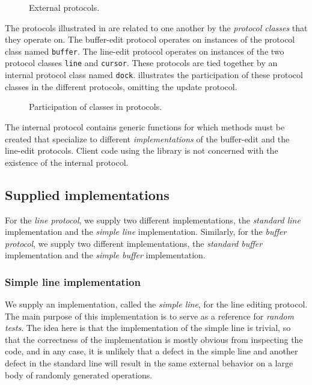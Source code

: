 \begin{figure}
\begin{center}
\end{center}
\caption{\label{fig-external-protocols}
External protocols.}
\end{figure}

The protocols illustrated in  are
related to one another by the \emph{protocol classes} that they
operate on.  The buffer-edit protocol operates on instances of the
protocol class named \texttt{buffer}.  The line-edit protocol operates
on instances of the two protocol classes \texttt{line} and
\texttt{cursor}.  These protocols are tied together by an internal
protocol class named \texttt{dock}.  
illustrates the participation of these protocol classes in the
different protocols, omitting the update protocol.

\begin{figure}
\begin{center}
\end{center}
\caption{\label{fig-participation}
Participation of classes in protocols.}
\end{figure}

The internal protocol contains generic functions for which methods
must be created that specialize to different \emph{implementations} of
the buffer-edit and the line-edit protocols.  Client code using the
library is not concerned with the existence of the internal protocol.

\subsection{Supplied implementations}

For the \emph{line protocol}, we supply two different implementations,
the \emph{standard line} implementation and the \emph{simple line}
implementation.  Similarly, for the \emph{buffer protocol}, we supply
two different implementations, the \emph{standard buffer} implementation
and the \emph{simple buffer} implementation.

\subsubsection{Simple line implementation}

We supply an implementation, called the \emph{simple line}, for
the line editing protocol.  The main purpose of this implementation is
to serve as a reference for \emph{random tests}.  The idea here is
that the implementation of the simple line is trivial, so that the
correctness of the implementation is mostly obvious from inspecting
the code, and in any case, it is unlikely that a defect in the simple
line and another defect in the standard line will result in the same
external behavior on a large body of randomly generated operations.

